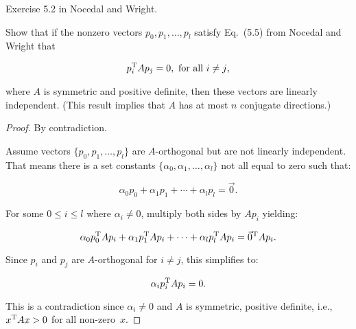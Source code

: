 \begin{problem}
  Exercise 5.2 in Nocedal and Wright.

  Show that if the nonzero vectors $p_0,p_1,\ldots,p_l$ satisfy Eq.~(5.5) from Nocedal and Wright that

  \[p_i^{\textnormal{T}} A p_{j} = 0, \textnormal{ for all } i \ne j\text{,}\]

  \noindent
  where $A$ is symmetric and positive definite, then these vectors are linearly independent. (This result implies that $A$ has at most $n$ conjugate directions.)
\end{problem}

\begin{proof}
  By contradiction.

  Assume vectors $\{p_0,p_1,\ldots,p_l\}$ are $A$-orthogonal but are not linearly independent.  That means there is a set constants $\{\alpha_0,\alpha_1,\ldots,\alpha_{l}\}$ not all equal to zero such that:

  \[ \alpha_{0}p_{0} + \alpha_{1}p_{1} + \cdots +\alpha_{l}p_{l} = \vec{0} \text{.}\]

  \noindent
  For some $0\leq i \leq l$ where $\alpha_i \ne 0$, multiply both sides by $Ap_i$ yielding:

  \[ \alpha_{0}p_{0}^{\textnormal{T}} Ap_{i} + \alpha_{1}p_{1}^{\textnormal{T}} Ap_{i} + \cdots +\alpha_{l}p_{l}^{\textnormal{T}} Ap_{i} = \vec{0}^{\textnormal{T}} Ap_{i} \text{.}\]

  \noindent
  Since $p_{i}$ and $p_{j}$ are $A$-orthogonal for ${i\ne j}$, this simplifies to:

  \[ \alpha_{i}p_{i}^{\textnormal{T}} Ap_{i} = 0 \text{.}\]

  \noindent
  This is a contradiction since ${\alpha_i \ne 0}$ and $A$ is symmetric, positive definite, i.e.,~${x^{\textnormal{T}} A x > 0}$ for all non-zero~$x$.
\end{proof}
